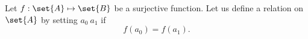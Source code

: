 \documentclass[../main.tex]{subfiles}
\begin{document}
\problem{}\label{s3p4}

Let \(\mapping{f}{\set{A}}{\set{B}}\) be a surjective function. Let us define a
relation on \(\set{A}\) by setting \({a_0}~{a_1}\) if \[f({a_0}) = f({a_1}).\]



\end{document}
